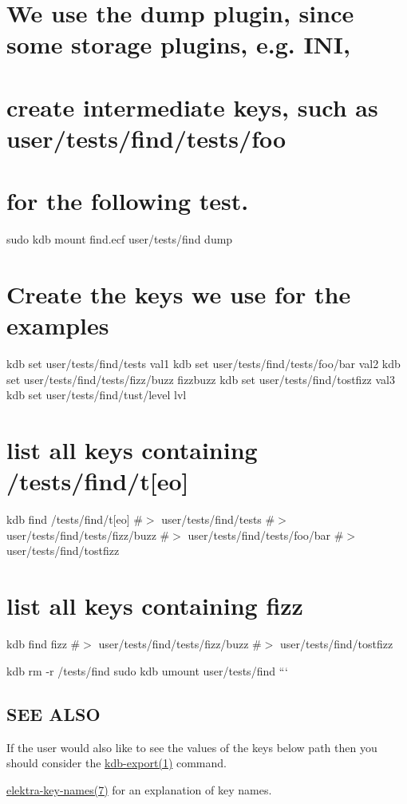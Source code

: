 \section*{We use the {\ttfamily dump} plugin, since some storage plugins, e.\+g. I\+NI,}

\section*{create intermediate keys, such as {\ttfamily user/tests/find/tests/foo}}

\section*{for the following test.}

sudo kdb mount find.\+ecf user/tests/find dump

\section*{Create the keys we use for the examples}

kdb set user/tests/find/tests val1 kdb set user/tests/find/tests/foo/bar val2 kdb set user/tests/find/tests/fizz/buzz fizzbuzz kdb set user/tests/find/tostfizz val3 kdb set user/tests/find/tust/level lvl

\section*{list all keys containing /tests/find/t\mbox{[}eo\mbox{]}}

kdb find \textquotesingle{}/tests/find/t\mbox{[}eo\mbox{]}\textquotesingle{} \#$>$ user/tests/find/tests \#$>$ user/tests/find/tests/fizz/buzz \#$>$ user/tests/find/tests/foo/bar \#$>$ user/tests/find/tostfizz

\section*{list all keys containing fizz}

kdb find \textquotesingle{}fizz\textquotesingle{} \#$>$ user/tests/find/tests/fizz/buzz \#$>$ user/tests/find/tostfizz

kdb rm -\/r /tests/find sudo kdb umount user/tests/find ```

\subsection*{S\+EE A\+L\+SO}


\begin{DoxyItemize}
\item If the user would also like to see the values of the keys below {\ttfamily path} then you should consider the \hyperlink{doc_help_kdb-export_md}{kdb-\/export(1)} command.
\item \hyperlink{doc_help_elektra-key-names_md}{elektra-\/key-\/names(7)} for an explanation of key names. 
\end{DoxyItemize}